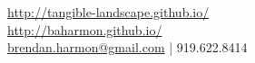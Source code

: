 \documentclass[]{baharmon-cv}
\begin{document}
%
%

%
%
{\vspace*{0.1cm} \url{http://tangible-landscape.github.io/} \\
\url{http://baharmon.github.io/}\\ 
\href{mailto:brendan.harmon@gmail.com}{brendan.harmon@gmail.com} | 919.622.8414 \\
}
%
%



%
%

\end{document}
